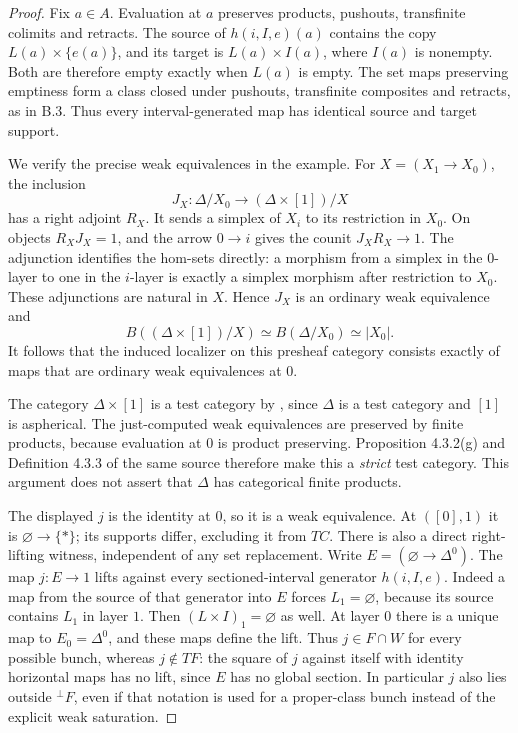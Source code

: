 \begin{proof}
Fix $a\in A$.  Evaluation at $a$ preserves products, pushouts,
transfinite colimits and retracts.  The source of
$h(i,I,e)(a)$ contains the copy $L(a)\times\{e(a)\}$, and its target is
$L(a)\times I(a)$, where $I(a)$ is nonempty.  Both are therefore empty
exactly when $L(a)$ is empty.  The set maps preserving emptiness form a
class closed under pushouts, transfinite composites and retracts, as in
B.3.  Thus every interval-generated map has identical source and target
support.

We verify the precise weak equivalences in the example.  For
$X=(X_1\to X_0)$, the inclusion
\[
 J_X:\Delta/X_0\longrightarrow (\Delta\times[1])/X
\]
has a right adjoint $R_X$.  It sends a simplex of $X_i$ to its restriction
in $X_0$.  On objects $R_XJ_X=1$, and the arrow $0\to i$ gives the
counit $J_XR_X\to1$.  The adjunction identifies the hom-sets directly:
a morphism from a simplex in the $0$-layer to one in the $i$-layer is
exactly a simplex morphism after restriction to $X_0$.
These adjunctions are natural in $X$.  Hence $J_X$ is an ordinary weak
equivalence and
\[
 B((\Delta\times[1])/X)\simeq B(\Delta/X_0)\simeq |X_0|.
\]
It follows that the induced localizer on this presheaf category consists
exactly of maps that are ordinary weak equivalences at $0$.

The category $\Delta\times[1]$ is a test category by
\citet[Corollary 4.1.22]{Cisinski2006B}, since $\Delta$ is a test category
and $[1]$ is aspherical.  The just-computed weak equivalences are preserved
by finite products, because evaluation at $0$ is product preserving.
Proposition 4.3.2(g) and Definition 4.3.3 of the same source therefore
make this a \emph{strict} test category.  This argument does not assert
that $\Delta$ has categorical finite products.

The displayed $j$ is the identity at $0$, so it is a weak equivalence.
At $([0],1)$ it is $\varnothing\to\{*\}$; its supports differ, excluding
it from $TC$.  There is also a direct right-lifting witness, independent
of any set replacement.  Write $E=(\varnothing\to\Delta^0)$.
The map $j:E\to1$ lifts against every sectioned-interval generator
$h(i,I,e)$.  Indeed a map from the source of that generator into $E$
forces $L_1=\varnothing$, because its source contains $L_1$ in layer
$1$.  Then $(L\times I)_1=\varnothing$ as well.  At layer $0$ there is
a unique map to $E_0=\Delta^0$, and these maps define the lift.
Thus $j\in F\cap W$ for every possible bunch, whereas $j\notin TF$:
the square of $j$ against itself with identity horizontal maps has no
lift, since $E$ has no global section.  In particular $j$ also lies
outside ${}^{\perp}F$, even if that notation is used for a proper-class
bunch instead of the explicit weak saturation.


\end{proof}
